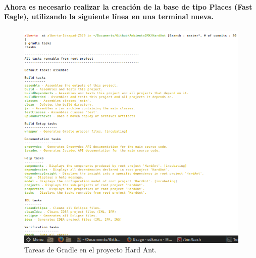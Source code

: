   \paragraph{Ahora es necesario realizar la creación de la base de tipo Places (Fast Eagle), utilizando la siguiente línea en una terminal nueva.}
  \begin{figure}[h!]
	\centering
		\includegraphics[width=\textwidth]{./images/TerminalGradle}
		\caption{Tareas de Gradle en el proyecto Hard Ant.}
  \end{figure}  
